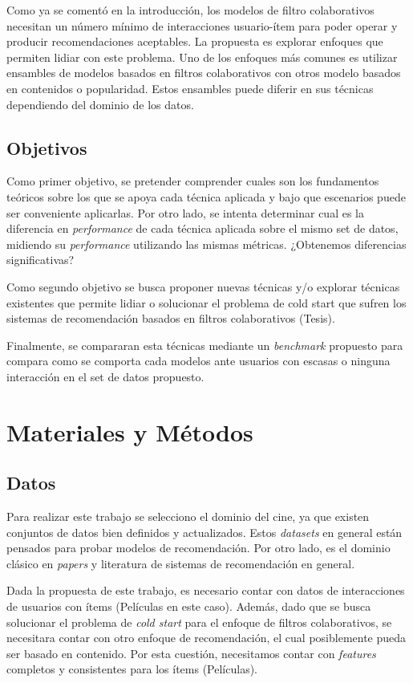 \documentclass[11pt,a4paper,twoside]{thesis}
\begin{document}
Como ya se comentó en la introducción, los modelos de filtro colaborativos
necesitan un número mínimo de interacciones usuario-ítem para poder operar y
producir recomendaciones aceptables. La propuesta es explorar enfoques que
permiten lidiar con este problema. Uno de los enfoques más comunes es utilizar
ensambles de modelos basados en filtros colaborativos con otros modelo basados
en contenidos o popularidad. Estos ensambles puede diferir en sus técnicas
dependiendo del dominio de los datos.

\section{Objetivos}

Como primer objetivo, se pretender comprender cuales son los fundamentos
teóricos sobre los que se apoya cada técnica aplicada y bajo que escenarios
puede ser conveniente aplicarlas. Por otro lado, se intenta determinar cual es
la diferencia en \textit{performance} de cada técnica aplicada sobre el mismo
set de datos, midiendo su \textit{performance} utilizando las mismas métricas.
¿Obtenemos diferencias significativas?

Como segundo objetivo se busca proponer nuevas técnicas y/o explorar técnicas
existentes que permite lidiar o solucionar el problema de cold start que sufren
los sistemas de recomendación basados en filtros colaborativos (Tesis).

Finalmente, se compararan esta técnicas mediante un \textit{benchmark}
propuesto para compara como se comporta cada modelos ante usuarios con escasas
o ninguna interacción en el set de datos propuesto.

\chapter{Materiales y Métodos}

\section{Datos}

Para realizar este trabajo se selecciono el dominio del cine, ya que existen
conjuntos de datos bien definidos y actualizados. Estos \textit{datasets} en
general están pensados para probar modelos de recomendación. Por otro lado, es
el dominio clásico en \textit{papers} y literatura de sistemas de recomendación
en general.

Dada la propuesta de este trabajo, es necesario contar con datos de
interacciones de usuarios con ítems (Películas en este caso). Además, dado que
se busca solucionar el problema de \textit{cold start} para el enfoque de
filtros colaborativos, se necesitara contar con otro enfoque de recomendación,
el cual posiblemente pueda ser basado en contenido. Por esta cuestión,
necesitamos contar con \textit{features} completos y consistentes para los
ítems (Películas).
\end{document}
